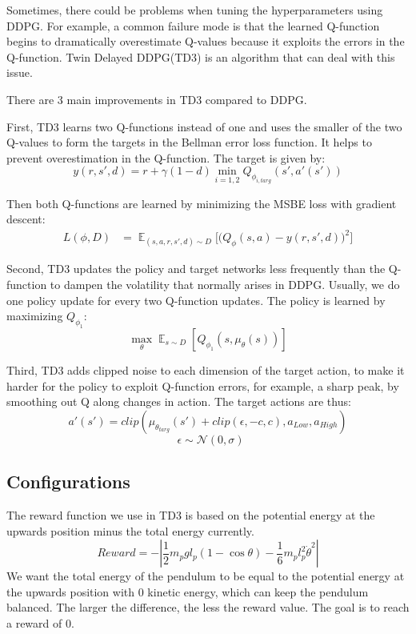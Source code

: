 \documentclass{LTHtwocol} %
\begin{document}
Sometimes, there could be problems when tuning the hyperparameters using DDPG. For example, a common failure mode is that the learned Q-function begins to dramatically overestimate Q-values because it exploits the errors in the Q-function. Twin Delayed DDPG(TD3) is an algorithm that can deal with this issue.

There are 3 main improvements in TD3 compared to DDPG.

First, TD3 learns two Q-functions instead of one and uses the smaller of the two Q-values to form the targets in the Bellman error loss function. It helps to prevent overestimation in the Q-function. The target is given by:
\begin{equation}
    y(r,s',d)= r+\gamma(1-d)\min_{i=1,2} Q_{\phi_{i,targ}}(s',a'(s'))
\end{equation}

Then both Q-functions are learned by minimizing the MSBE loss with gradient descent:
\begin{equation}
\begin{aligned}
L(\phi,D)&=\displaystyle \mathop{\mathbb{E}}_{(s,a,r,s',d)\sim D} \bigg[\Big(Q_{\phi}(s,a)-y(r,s',d)\Big)^2\bigg]
\end{aligned}
\end{equation}

Second, TD3 updates the policy and target networks less frequently than the Q-function to dampen the volatility that normally arises in DDPG. Usually, we do one policy update for every two Q-function updates. The policy is learned by maximizing $Q_{\phi_1}$:
\[
\max_\theta \displaystyle \mathop{\mathbb{E}}_{s\sim D}[Q_{\phi_1}(s,\mu_\theta(s))]
\]

Third, TD3 adds clipped noise to each dimension of the target action, to make it harder for the policy to exploit Q-function errors, for example, a sharp peak, by smoothing out Q along changes in action. The target actions are thus:
\begin{equation}
    a'(s')=clip(\mu_{\theta_{targ}}(s')+clip(\epsilon,-c,c),a_{Low},a_{High})
\end{equation}
\[
\enspace \epsilon \sim \mathcal{N}(0,\sigma)
\]
\subsection{Configurations}
The reward function we use in TD3 is based on the potential energy at the upwards position minus the total energy currently.
\begin{equation}
    Reward=-|\frac{1}{2}m_p g l_p (1-\cos\theta) - \frac{1}{6} m_p l_p^2 \dot{\theta}^2|
\end{equation}
We want the total energy of the pendulum to be equal to the potential energy at the upwards position with 0 kinetic energy, which can keep the pendulum balanced. The larger the difference, the less the reward value. The goal is to reach a reward of 0.
\end{document}

